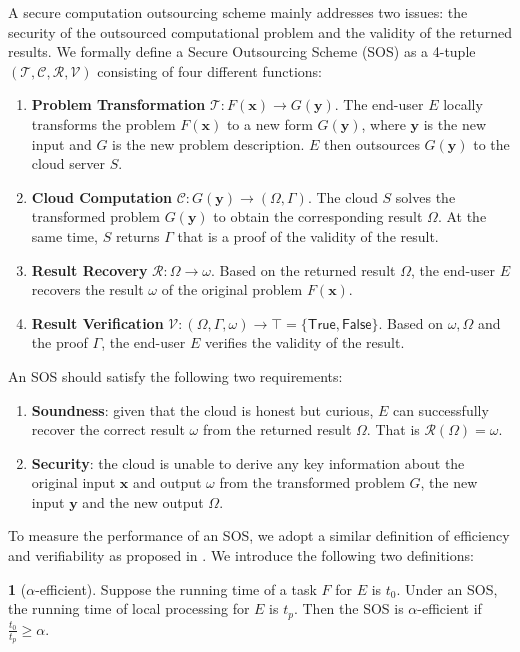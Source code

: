 \documentclass[english,draftcls,onecolumn,11pt]{IEEEtran}
\theoremstyle{definition}
\newtheorem{defn}{\protect\definitionname}
\theoremstyle{plain}
\theoremstyle{plain}
\theoremstyle{definition}
\providecommand{\definitionname}{Definition}
\begin{document}
A secure computation outsourcing scheme mainly addresses two issues:
the security of the outsourced computational problem and the validity
of the returned results. We formally define a Secure Outsourcing Scheme
(SOS) as a 4-tuple $(\mathcal{T},\mathcal{C},\mathcal{R},\mathcal{V})$
consisting of four different functions:
\begin{enumerate}
\item \textbf{Problem Transformation} $\mathcal{T}:F(\mathbf{x})\to G(\mathbf{y})$.
The end-user $E$ locally transforms the problem $F(\mathbf{x})$
to a new form $G(\mathbf{y})$, where $\mathbf{y}$ is the new input
and $G$ is the new problem description. $E$ then outsources $G(\mathbf{y})$
to the cloud server $S$.
\item \textbf{Cloud Computation} $\mathcal{C}:G(\mathbf{y})\rightarrow(\Omega,\Gamma)$.
The cloud $S$ solves the transformed problem $G(\mathbf{y})$ to
obtain the corresponding result $\Omega$. At the same time, $S$
returns $\Gamma$ that is a proof of the validity of the result.
\item \textbf{Result Recovery} $\mathcal{R}:\Omega\rightarrow\omega$. Based
on the returned result $\Omega$, the end-user $E$ recovers the result
$\omega$ of the original problem $F(\mathbf{x})$.
\item \textbf{Result Verification} $\mathcal{V}:(\Omega,\Gamma,\omega)\rightarrow\top=\{\mathsf{True},\mathsf{False}\}$.
Based on $\omega,\Omega$ and the proof $\Gamma$, the end-user $E$
verifies the validity of the result.
\end{enumerate}
An SOS should satisfy the following two requirements:
\begin{enumerate}
\item \textbf{Soundness}: given that the cloud is honest but curious, $E$
can successfully recover the correct result $\omega$ from the returned
result $\Omega$. That is $\mathcal{R}(\Omega)=\omega$.
\item \textbf{Security}: the cloud is unable to derive any key information
about the original input $\mathbf{x}$ and output $\omega$ from the
transformed problem $G$, the new input $\mathbf{y}$ and the new
output $\Omega$. 
\end{enumerate}
To measure the performance of an SOS, we adopt a similar definition
of efficiency and verifiability as proposed in \cite{hohenberger2005securely}.
We introduce the following two definitions:
\begin{defn}[$\alpha$-efficient]
\label{def:efficient} Suppose the running time of a task $F$ for
$E$ is $t_{0}$. Under an SOS, the running time of local processing
for $E$ is $t_{p}$. Then the SOS is $\alpha$-efficient if $\frac{t_{0}}{t_{p}}\geq\alpha$.
\end{defn}
\end{document}
